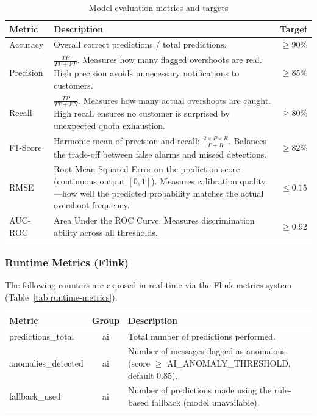 \begin{table}[htbp]
    \justifying
    \centering
    \begin{tabularx}{\textwidth}{|l|X|c|}
        \hline
        \textbf{Metric} & \textbf{Description} & \textbf{Target} \\
        \hline
        Accuracy &
        Overall correct predictions / total predictions. &
        $\geq 90\%$ \\
        \hline
        Precision &
        $\frac{TP}{TP + FP}$. Measures how many flagged overshoots are real.
        High precision avoids unnecessary notifications to customers. &
        $\geq 85\%$ \\
        \hline
        Recall &
        $\frac{TP}{TP + FN}$. Measures how many actual overshoots are caught.
        High recall ensures no customer is surprised by unexpected quota exhaustion. &
        $\geq 80\%$ \\
        \hline
        F1-Score &
        Harmonic mean of precision and recall: $\frac{2 \times P \times R}{P + R}$.
        Balances the trade-off between false alarms and missed detections. &
        $\geq 82\%$ \\
        \hline
        RMSE &
        Root Mean Squared Error on the prediction score (continuous output $[0, 1]$).
        Measures calibration quality---how well the predicted probability matches the
        actual overshoot frequency. &
        $\leq 0.15$ \\
        \hline
        AUC-ROC &
        Area Under the ROC Curve. Measures discrimination ability across all thresholds. &
        $\geq 0.92$ \\
        \hline
    \end{tabularx}
    \caption{Model evaluation metrics and targets}
    \label{tab:metrics}
\end{table}

\subsubsection{Runtime Metrics (Flink)}

The following counters are exposed in real-time via the Flink metrics system
(Table~\ref{tab:runtime-metrics}).

\begin{center}
    \justifying
    \begin{tabularx}{\textwidth}{|l|c|X|}
        \hline
        \textbf{Metric} & \textbf{Group} & \textbf{Description} \\
        \hline
        predictions\_total & ai &
        Total number of predictions performed. \\
        \hline
        anomalies\_detected & ai &
        Number of messages flagged as anomalous (score $\geq$ AI\_ANOMALY\_THRESHOLD, default 0.85). \\
        \hline
        fallback\_used & ai &
        Number of predictions made using the rule-based fallback (model unavailable). \\
        \hline
    \end{tabularx}
    \label{tab:runtime-metrics}
\end{center}

